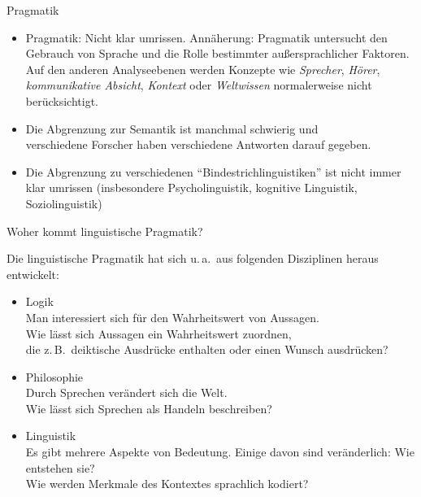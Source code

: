 \begin{frame}{Pragmatik}
  \begin{itemize}
  \item Pragmatik: Nicht klar umrissen. Annäherung: Pragmatik untersucht den Gebrauch von Sprache und die Rolle bestimmter außersprachlicher Faktoren. Auf den anderen Analyseebenen werden Konzepte wie \emph{Sprecher}, \emph{Hörer}, \emph{kommunikative Absicht}, \emph{Kontext} oder \emph{Weltwissen} normalerweise nicht berücksichtigt.
  \item<2-> Die Abgrenzung zur Semantik ist manchmal schwierig und\\
            verschiedene Forscher haben verschiedene Antworten darauf gegeben.
  \item<3-> Die Abgrenzung zu verschiedenen "`Bindestrichlinguistiken"' ist nicht immer klar umrissen (insbesondere Psycholinguistik, kognitive Linguistik, Soziolinguistik)
  \end{itemize}

\end{frame}


\begin{frame}{Woher kommt linguistische Pragmatik?}
  
Die linguistische Pragmatik hat sich u.\,a.\ aus folgenden Disziplinen heraus entwickelt:

\begin{itemize}
\item \alert{Logik}\\
  Man interessiert sich für den Wahrheitswert von Aussagen.\\
  Wie lässt sich Aussagen ein Wahrheitswert zuordnen,\\
  die z.\,B.\ deiktische Ausdrücke enthalten oder einen Wunsch ausdrücken?
\item<2-> \alert{Philosophie}\\
  Durch Sprechen verändert sich die Welt.\\
  Wie lässt sich Sprechen als Handeln beschreiben?
\item<3-> \alert{Linguistik}\\
Es gibt mehrere Aspekte von Bedeutung. Einige davon sind veränderlich: Wie entstehen sie?\\
 Wie werden Merkmale des Kontextes sprachlich kodiert?
\end{itemize}

\end{frame}




